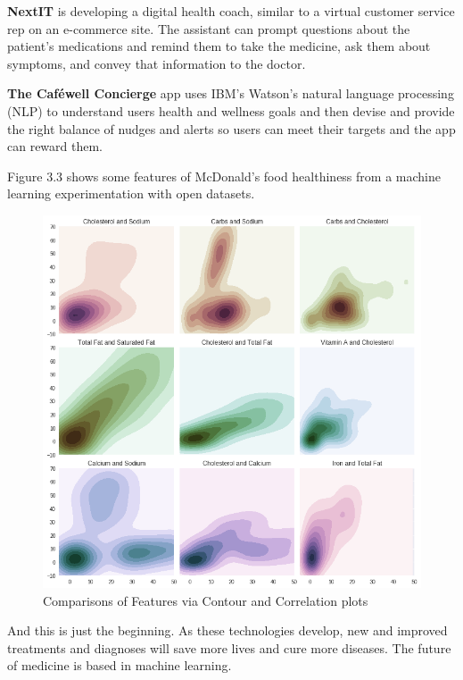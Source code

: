 \textbf{NextIT} is developing a digital health coach, similar to a virtual customer service rep on an e-commerce site. The assistant can prompt questions about the patient’s medications and remind them to take the medicine, ask them about symptoms, and convey that information to the doctor.

\textbf{The Caféwell Concierge} app uses IBM’s Watson’s natural language processing (NLP) to understand users health and wellness goals and then devise and provide the right balance of nudges and alerts so users can meet their targets and the app can reward them.

Figure 3.3 shows some features of McDonald's food healthiness from a machine learning experimentation with open datasets\cite{macd}.
\begin{figure}
\centering
\includegraphics[scale=0.5]{mcd}
\caption{Comparisons of Features via Contour and Correlation plots}
\end{figure}

And this is just the beginning.  As these technologies develop, new and improved treatments and diagnoses will save more lives and cure more diseases. The future of medicine is based in machine learning.